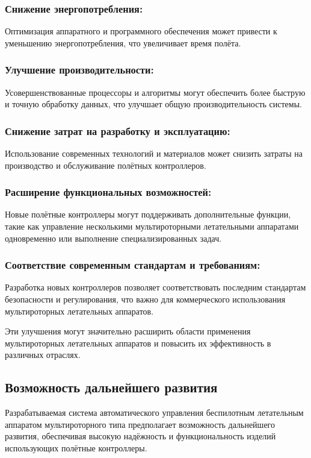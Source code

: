 \documentclass[a4paper]{bsuir-tor}
\begin{document}
  \subsubsection{Снижение энергопотребления: }
  Оптимизация аппаратного и программного обеспечения может привести к
  уменьшению энергопотребления, что увеличивает время полёта.

  \subsubsection{Улучшение производительности: }
  Усовершенствованные процессоры и алгоритмы могут обеспечить более
  быструю и точную обработку данных, что улучшает общую
  производительность системы.

  \subsubsection{Снижение затрат на разработку и эксплуатацию: }
  Использование современных технологий и материалов может снизить
  затраты на производство и обслуживание полётных контроллеров.

  \subsubsection{Расширение функциональных возможностей: }
  Новые полётные контроллеры могут поддерживать дополнительные
  функции, такие как управление несколькими мультироторными
  летательными аппаратами одновременно или выполнение специализированных
  задач.

  \subsubsection{Соответствие современным стандартам и требованиям: }
  Разработка новых контроллеров позволяет соответствовать последним
  стандартам безопасности и регулирования, что важно для коммерческого
  использования мультироторных летательных аппаратов.

  Эти улучшения могут значительно расширить области применения
  мультироторных летательных аппаратов и повысить их эффективность в
  различных отраслях.

  \subsection{Возможность дальнейшего развития}
  Разрабатываемая система автоматического управления беспилотным
  летательным аппаратом мультироторного типа
  предполагает возможность дальнейшего развития, обеспечивая высокую
  надёжность и функциональность изделий использующих полётные
  контроллеры.
\end{document}
